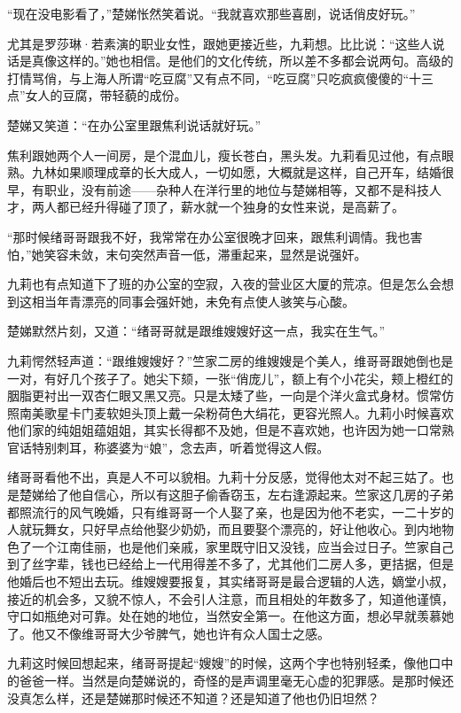 \par “现在没电影看了，”楚娣怅然笑着说。“我就喜欢那些喜剧，说话俏皮好玩。”
\par 尤其是罗莎琳·若素演的职业女性，跟她更接近些，九莉想。比比说：“这些人说话是真像这样的。”她也相信。是他们的文化传统，所以差不多都会说两句。高级的打情骂俏，与上海人所谓“吃豆腐”又有点不同，“吃豆腐”只吃疯疯傻傻的“十三点”女人的豆腐，带轻藐的成份。
\par 楚娣又笑道：“在办公室里跟焦利说话就好玩。”
\par 焦利跟她两个人一间房，是个混血儿，瘦长苍白，黑头发。九莉看见过他，有点眼熟。九林如果顺理成章的长大成人，一切如愿，大概就是这样，自己开车，结婚很早，有职业，没有前途——杂种人在洋行里的地位与楚娣相等，又都不是科技人才，两人都已经升得碰了顶了，薪水就一个独身的女性来说，是高薪了。
\par “那时候绪哥哥跟我不好，我常常在办公室很晚才回来，跟焦利调情。我也害怕，”她笑容未敛，末句突然声音一低，滞重起来，显然是说强奸。
\par 九莉也有点知道下了班的办公室的空寂，入夜的营业区大厦的荒凉。但是怎么会想到这相当年青漂亮的同事会强奸她，未免有点使人骇笑与心酸。
\par 楚娣默然片刻，又道：“绪哥哥就是跟维嫂嫂好这一点，我实在生气。”
\par 九莉愕然轻声道：“跟维嫂嫂好？”竺家二房的维嫂嫂是个美人，维哥哥跟她倒也是一对，有好几个孩子了。她尖下颏，一张“俏庞儿”，额上有个小花尖，颊上橙红的胭脂更衬出一双杏仁眼又黑又亮。只是太矮了些，一向是个洋火盒式身材。惯常仿照南美歌星卡门麦软妲头顶上戴一朵粉荷色大绢花，更容光照人。九莉小时候喜欢他们家的纯姐姐蕴姐姐，其实长得都不及她，但是不喜欢她，也许因为她一口常熟官话特别刺耳，称婆婆为“娘”，念去声，听着觉得这人假。
\par 绪哥哥看他不出，真是人不可以貌相。九莉十分反感，觉得他太对不起三姑了。也是楚娣给了他自信心，所以有这胆子偷香窃玉，左右逢源起来。竺家这几房的子弟都照流行的风气晚婚，只有维哥哥一个人娶了亲，也是因为他不老实，一二十岁的人就玩舞女，只好早点给他娶少奶奶，而且要娶个漂亮的，好让他收心。到内地物色了一个江南佳丽，也是他们亲戚，家里既守旧又没钱，应当会过日子。竺家自己到了丝字辈，钱也已经给上一代用得差不多了，尤其他们二房人多，更拮据，但是他婚后也不短出去玩。维嫂嫂要报复，其实绪哥哥是最合逻辑的人选，嫡堂小叔，接近的机会多，又貌不惊人，不会引人注意，而且相处的年数多了，知道他谨慎，守口如瓶绝对可靠。处在她的地位，当然安全第一。在他这方面，想必早就羡慕她了。他又不像维哥哥大少爷脾气，她也许有众人国士之感。
\par 九莉这时候回想起来，绪哥哥提起“嫂嫂”的时候，这两个字也特别轻柔，像他口中的爸爸一样。当然是向楚娣说的，奇怪的是声调里毫无心虚的犯罪感。是那时候还没真怎么样，还是楚娣那时候还不知道？还是知道了他也仍旧坦然？
